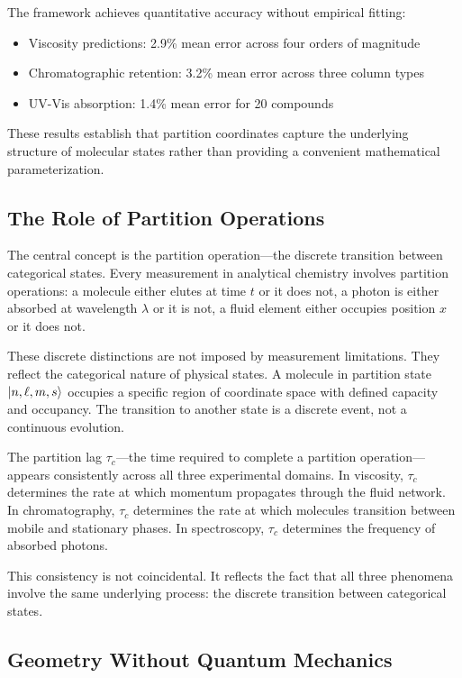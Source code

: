 \documentclass[twocolumn,superscriptaddress,prb,10pt]{revtex4-2}
\begin{document}
The framework achieves quantitative accuracy without empirical fitting:
\begin{itemize}
\item Viscosity predictions: 2.9\% mean error across four orders of magnitude
\item Chromatographic retention: 3.2\% mean error across three column types
\item UV-Vis absorption: 1.4\% mean error for 20 compounds
\end{itemize}

These results establish that partition coordinates capture the underlying structure of molecular states rather than providing a convenient mathematical parameterization.

\subsection{The Role of Partition Operations}

The central concept is the partition operation—the discrete transition between categorical states. Every measurement in analytical chemistry involves partition operations: a molecule either elutes at time $t$ or it does not, a photon is either absorbed at wavelength $\lambda$ or it is not, a fluid element either occupies position $x$ or it does not.

These discrete distinctions are not imposed by measurement limitations. They reflect the categorical nature of physical states. A molecule in partition state $\ket{n,\ell,m,s}$ occupies a specific region of coordinate space with defined capacity and occupancy. The transition to another state is a discrete event, not a continuous evolution.

The partition lag $\tau_c$—the time required to complete a partition operation—appears consistently across all three experimental domains. In viscosity, $\tau_c$ determines the rate at which momentum propagates through the fluid network. In chromatography, $\tau_c$ determines the rate at which molecules transition between mobile and stationary phases. In spectroscopy, $\tau_c$ determines the frequency of absorbed photons.

This consistency is not coincidental. It reflects the fact that all three phenomena involve the same underlying process: the discrete transition between categorical states.

\subsection{Geometry Without Quantum Mechanics}
\end{document}
